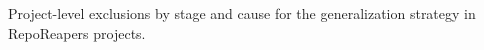 \begin{table}[tbp]
  \caption{Project-level exclusions by stage and cause for the \VariantImprovedC{} generalization strategy in RepoReapers projects.}
  \label{tab:processing-failures}
  \centering
  
\end{table}